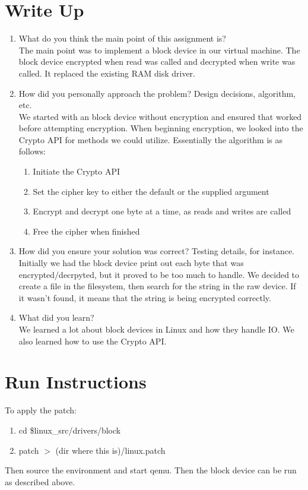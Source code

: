 \documentclass[letterpaper,10pt,draftclsnofoot,onecolumn,titlepage]{IEEEtran}
\begin{document}
\section{Write Up}
\begin{enumerate}
                \item What do you think the main point of this assignment is? \\
The main point was to implement a block device in our virtual machine. The block device encrypted when read was called and decrypted when write was called. It replaced the existing RAM disk driver.
                \item How did you personally approach the problem? Design decisions, algorithm, etc. \\
We started with an block device without encryption and ensured that worked before attempting encryption. When beginning encryption, we looked into the Crypto API for methods we could utilize. Essentially the algorithm is as follows:
\begin{enumerate}
   \item Initiate the Crypto API
   \item Set the cipher key to either the default or the supplied argument
   \item Encrypt and decrypt one byte at a time, as reads and writes are called
   \item Free the cipher when finished
\end{enumerate}

                \item How did you ensure your solution was correct? Testing details, for instance. \\
Initially we had the block device print out each byte that was encrypted/decrpyted, but it proved to be too much to handle. We decided to create a file in the filesystem, then search for the string in the raw device. If it wasn't found, it means that the string is being encrypted correctly.
                \item What did you learn? \\
We learned a lot about block devices in Linux and how they handle IO. We also learned how to use the Crypto API.
\end{enumerate}

\section{Run Instructions}
To apply the patch:
\begin{enumerate}
   \item cd \$linux\_src/drivers/block
   \item patch $>$ (dir where this is)/linux.patch
\end{enumerate}

Then source the environment and start qemu. Then the block device can be run as described above.
\end{document}
